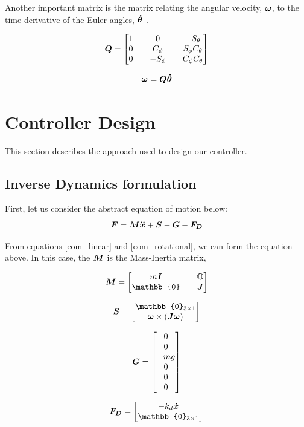 \documentclass[12pt,fleqn]{article}
\newcommand{\mbm}[1]{\mbox{\boldmath $#1$}}
\begin{document}
Another important matrix is the matrix relating the angular velocity, $\mbm{\omega}$, to the time derivative of the Euler angles, $\mbm{\dot{\theta}}$ \cite{Andrew}.

$$ \mbm{Q} = \begin{bmatrix} 1 && 0 && -S_{\theta} \\
0 && C_\phi && S_\phi C_\theta \\ 0 && -S_\phi && C_\phi C_\theta \end{bmatrix} $$

$$ \mbm{\omega} = \mbm{Q} \mbm{\dot{\theta}} $$

\section{Controller Design}
This section describes the approach used to design our controller.

\subsection{Inverse Dynamics formulation}
First, let us consider the abstract equation of motion below:
\begin{equation} \label{eom_abstract}
$$ \mbm{F} = \mbm{M}\mbm{\ddot{x}} + \mbm{S} -\mbm{G} - \mbm{F_D} $$
\end{equation}

From equations \ref{eom_linear} and \ref{eom_rotational}, we can form
the equation above. In this case, the $\mbm{M}$ is the Mass-Inertia
matrix, 

$$ \mbm{M} = \begin{bmatrix} m\mbm{I} && \mathbb{O}\\ \mathbb{0}&&
  \mbm{J}\end{bmatrix} $$

$$ \mbm{S} = \begin{bmatrix} \mathbb{0}_{3\times1} \\ \mbm{\omega} \times
  (\mbm{J\omega}) \end{bmatrix} $$

$$ \mbm{G} = \begin{bmatrix} 0 \\ 0\\ -mg\\ 0\\ 0\\ 0 \end{bmatrix} $$

$$ \mbm{F_D} = \begin{bmatrix} -k_d \mbm{\dot{x}}\\
  \mathbb{0}_{3\times1} \end{bmatrix} $$
\end{document}

